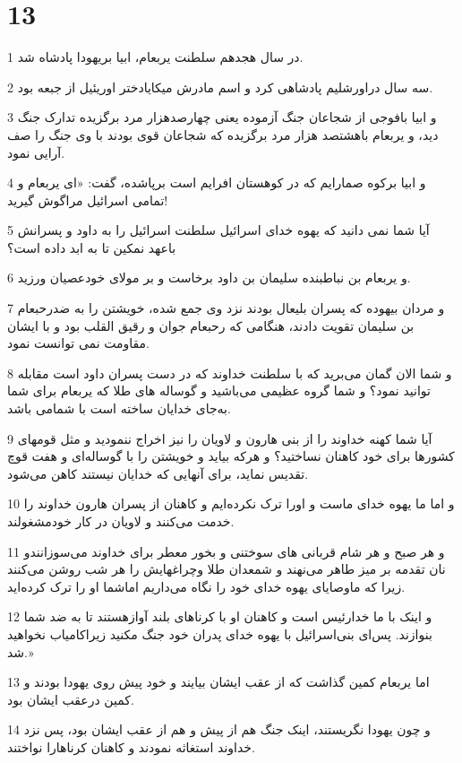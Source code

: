 \chapter{13}

\par 1 در سال هجدهم سلطنت یربعام، ابیا بریهودا پادشاه شد.
\par 2 سه سال دراورشلیم پادشاهی کرد و اسم مادرش میکایادختر اوریئیل از جبعه بود.
\par 3 و ابیا بافوجی از شجاعان جنگ آزموده یعنی چهارصدهزار مرد برگزیده تدارک جنگ دید، و یربعام باهشتصد هزار مرد برگزیده که شجاعان قوی بودند با وی جنگ را صف آرایی نمود.
\par 4 و ابیا برکوه صمارایم که در کوهستان افرایم است برپاشده، گفت: «ای یربعام و تمامی اسرائیل مراگوش گیرید!
\par 5 آیا شما نمی دانید که یهوه خدای اسرائیل سلطنت اسرائیل را به داود و پسرانش باعهد نمکین تا به ابد داده است؟
\par 6 و یربعام بن نباطبنده سلیمان بن داود برخاست و بر مولای خودعصیان ورزید.
\par 7 و مردان بیهوده که پسران بلیعال بودند نزد وی جمع شده، خویشتن را به ضدرحبعام بن سلیمان تقویت دادند، هنگامی که رحبعام جوان و رقیق القلب بود و با ایشان مقاومت نمی توانست نمود.
\par 8 و شما الان گمان می‌برید که با سلطنت خداوند که در دست پسران داود است مقابله توانید نمود؟ و شما گروه عظیمی می‌باشید و گوساله های طلا که یربعام برای شما به‌جای خدایان ساخته است با شمامی باشد.
\par 9 آیا شما کهنه خداوند را از بنی هارون و لاویان را نیز اخراج ننمودید و مثل قومهای کشورها برای خود کاهنان نساختید؟ و هرکه بیاید و خویشتن را با گوساله‌ای و هفت قوچ تقدیس نماید، برای آنهایی که خدایان نیستند کاهن می‌شود.
\par 10 و اما ما یهوه خدای ماست و اورا ترک نکرده‌ایم و کاهنان از پسران هارون خداوند را خدمت می‌کنند و لاویان در کار خودمشغولند.
\par 11 و هر صبح و هر شام قربانی های سوختنی و بخور معطر برای خداوند می‌سوزانندو نان تقدمه بر میز طاهر می‌نهند و شمعدان طلا وچراغهایش را هر شب روشن می‌کنند زیرا که ماوصایای یهوه خدای خود را نگاه می‌داریم اماشما او را ترک کرده‌اید.
\par 12 و اینک با ما خدارئیس است و کاهنان او با کرناهای بلند آوازهستند تا به ضد شما بنوازند. پس‌ای بنی‌اسرائیل با یهوه خدای پدران خود جنگ مکنید زیراکامیاب نخواهید شد.»
\par 13 اما یربعام کمین گذاشت که از عقب ایشان بیایند و خود پیش روی یهودا بودند و کمین درعقب ایشان بود.
\par 14 و چون یهودا نگریستند، اینک جنگ هم از پیش و هم از عقب ایشان بود، پس نزد خداوند استغاثه نمودند و کاهنان کرناهارا نواختند.
